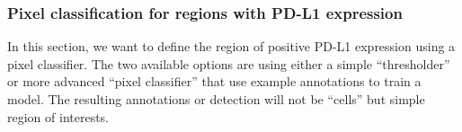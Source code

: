 \documentclass[a4paper,DIV=17,dvipsnames,headsepline]{scrartcl}
\begin{document}
    
    

\subsubsection{Pixel classification for regions with PD-L1 expression}

In this section, we want to define the region of positive PD-L1 expression using a pixel classifier. The two available options are using either a simple ``thresholder'' or more advanced ``pixel classifier'' that use example annotations to train a model. The resulting annotations or detection will not be ``cells'' but simple region of interests. 
\end{document}
